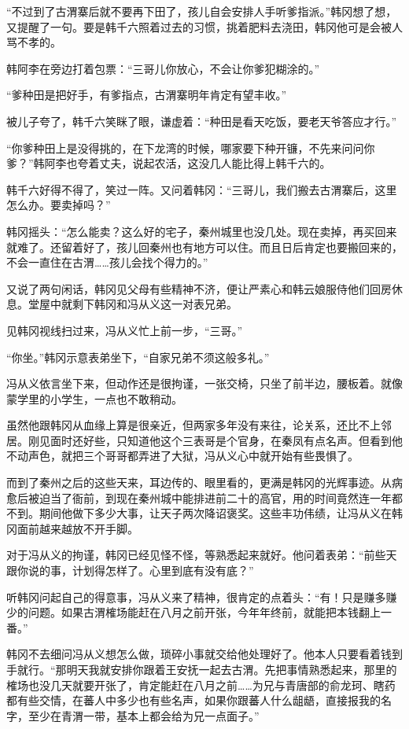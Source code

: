 “不过到了古渭寨后就不要再下田了，孩儿自会安排人手听爹指派。”韩冈想了想，又提醒了一句。要是韩千六照着过去的习惯，挑着肥料去浇田，韩冈他可是会被人骂不孝的。

韩阿李在旁边打着包票：“三哥儿你放心，不会让你爹犯糊涂的。”

“爹种田是把好手，有爹指点，古渭寨明年肯定有望丰收。”

被儿子夸了，韩千六笑眯了眼，谦虚着：“种田是看天吃饭，要老天爷答应才行。”

“你爹种田上是没得挑的，在下龙湾的时候，哪家要下种开镰，不先来问问你爹？”韩阿李也夸着丈夫，说起农活，这没几人能比得上韩千六的。

韩千六好得不得了，笑过一阵。又问着韩冈：“三哥儿，我们搬去古渭寨后，这里怎么办。要卖掉吗？”

韩冈摇头：“怎么能卖？这么好的宅子，秦州城里也没几处。现在卖掉，再买回来就难了。还留着好了，孩儿回秦州也有地方可以住。而且日后肯定也要搬回来的，不会一直住在古渭……孩儿会找个得力的。”

又说了两句闲话，韩冈见父母有些精神不济，便让严素心和韩云娘服侍他们回房休息。堂屋中就剩下韩冈和冯从义这一对表兄弟。

见韩冈视线扫过来，冯从义忙上前一步，“三哥。”

“你坐。”韩冈示意表弟坐下，“自家兄弟不须这般多礼。”

冯从义依言坐下来，但动作还是很拘谨，一张交椅，只坐了前半边，腰板着。就像蒙学里的小学生，一点也不敢稍动。

虽然他跟韩冈从血缘上算是很亲近，但两家多年没有来往，论关系，还比不上邻居。刚见面时还好些，只知道他这个三表哥是个官身，在秦凤有点名声。但看到他不动声色，就把三个哥哥都弄进了大狱，冯从义心中就开始有些畏惧了。

而到了秦州之后的这些天来，耳边传的、眼里看的，更满是韩冈的光辉事迹。从病愈后被迫当了衙前，到现在秦州城中能排进前二十的高官，用的时间竟然连一年都不到。期间他做下多少大事，让天子两次降诏褒奖。这些丰功伟绩，让冯从义在韩冈面前越来越放不开手脚。

对于冯从义的拘谨，韩冈已经见怪不怪，等熟悉起来就好。他问着表弟：“前些天跟你说的事，计划得怎样了。心里到底有没有底？”

听韩冈问起自己的得意事，冯从义来了精神，很肯定的点着头：“有！只是赚多赚少的问题。如果古渭榷场能赶在八月之前开张，今年年终前，就能把本钱翻上一番。”

韩冈不去细问冯从义想怎么做，琐碎小事就交给他处理好了。他本人只要看着钱到手就行。“那明天我就安排你跟着王安抚一起去古渭。先把事情熟悉起来，那里的榷场也没几天就要开张了，肯定能赶在八月之前……为兄与青唐部的俞龙珂、瞎药都有些交情，在蕃人中多少也有些名声，如果你跟蕃人什么龃龉，直接报我的名字，至少在青渭一带，基本上都会给为兄一点面子。”

